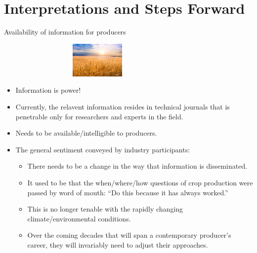 \documentclass[t,9pt,aspectratio=169]{beamer}
\begin{document}
\section{Interpretations and Steps Forward}

\begin{frame}{Availability of information for producers}

\begin{center}
\includegraphics[width=10cm, height=1.75cm]{./figures/wheat.jpeg}
\end{center}

\begin{itemize}
 \item Information is power!
 \item Currently, the relavent information resides in technical journals that is penetrable only for researchers and experts in the field. 
 \item Needs to be available/intelligible to producers.
 \item The general sentiment conveyed by industry participants:
 \begin{itemize}
 \item There needs to be a change in the way that information is disseminated.
 \item It used to be that the when/where/how questions of crop production were passed by word of mouth: ``Do this because it has always worked.''
 \item This is no longer tenable with the rapidly changing climate/environmental conditions.
 \item Over the coming decades that will span a contemporary producer's career, they will invariably need to adjust their approaches.
 \end{itemize}
\end{itemize}

\end{frame}
\end{document}
